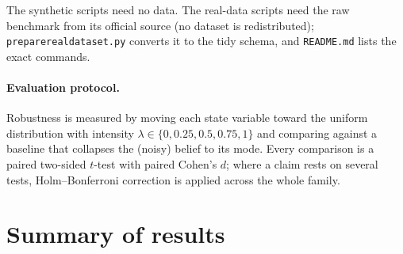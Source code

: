 \documentclass[11pt]{article}
\newcommand{\code}[1]{{\renewcommand{\_}{\textunderscore\hspace{0pt}}\texttt{#1}}}
\begin{document}
\noindent The synthetic scripts need no data. The real-data scripts need the raw benchmark from its official source (no dataset is redistributed); \code{prepare\_real\_dataset.py} converts it to the tidy schema, and \code{README.md} lists the exact commands.

\paragraph{Evaluation protocol.} Robustness is measured by moving each state variable toward the uniform distribution with intensity $\lambda\in\{0,0.25,0.5,0.75,1\}$ and comparing against a baseline that collapses the (noisy) belief to its mode. Every comparison is a paired two-sided $t$-test with paired Cohen's $d$; where a claim rests on several tests, Holm--Bonferroni correction is applied across the whole family.

\section{Summary of results}
\end{document}
